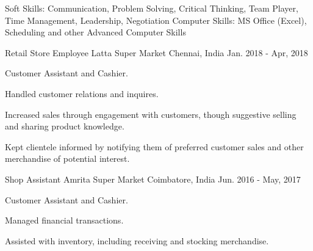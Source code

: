 \documentclass[12pt, a4paper]{awesome-cv}
\begin{document}
\makecvheader

\begin{cventries}
\end{cventries}

\begin{cvskills}
    \cvskill
        {Soft Skills:}
        {Communication, Problem Solving, Critical Thinking, Team Player, Time Management, Leadership, Negotiation}
    \cvskill
        {Computer Skills:}
        {MS Office (Excel), Scheduling and other Advanced Computer Skills}
\end{cvskills}

\begin{cventries}
\cventry
    {Retail Store Employee}
    {Latta Super Market}
    {Chennai, India}
    {Jan. 2018 - Apr, 2018}
    {
      \begin{cvitems}
        \item {Customer Assistant and Cashier.}
        \item {Handled customer relations and inquires.}
        \item {Increased sales through engagement with customers, though suggestive selling and sharing product knowledge.}
        \item {Kept clientele informed by notifying them of preferred customer sales and other merchandise of potential interest.}
      \end{cvitems}
    }
\cventry
    {Shop Assistant}
    {Amrita Super Market}
    {Coimbatore, India}
    {Jun. 2016 - May, 2017}
    {
      \begin{cvitems}
        \item {Customer Assistant and Cashier.}
        \item {Managed financial transactions.}
        \item {Assisted with inventory, including receiving and stocking merchandise.}
      \end{cvitems}
    }
\end{cventries}
\end{document}
